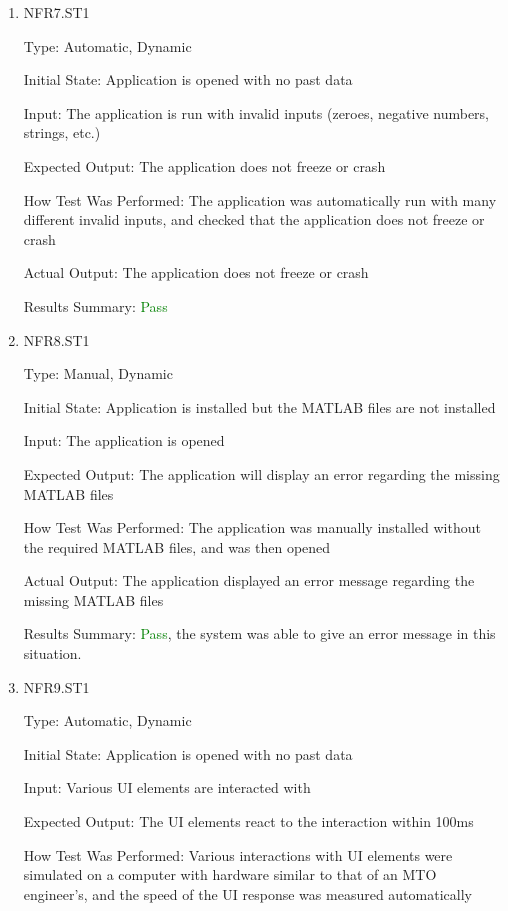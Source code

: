 \documentclass[12pt, titlepage]{article}
\begin{document}
\begin{enumerate}

\item{NFR7.ST1\\}

Type: Automatic, Dynamic

Initial State: Application is opened with no past data

Input: The application is run with invalid inputs (zeroes, negative numbers, strings, etc.)

Expected Output: The application does not freeze or crash

How Test Was Performed: The application was automatically run with many different invalid inputs, and checked that the application does not freeze or crash

Actual Output: The application does not freeze or crash

Results Summary: \textcolor{green} {Pass}

\item{NFR8.ST1\\}

Type: Manual, Dynamic

Initial State: Application is installed but the MATLAB files are not installed

Input: The application is opened

Expected Output: The application will display an error regarding the missing MATLAB files

How Test Was Performed: The application was manually installed without the required MATLAB files, and was then opened

Actual Output: The application displayed an error message regarding the missing MATLAB files

Results Summary: \textcolor{green} {Pass}, the system was able to give an error message in this situation.

\item{NFR9.ST1\\}

Type: Automatic, Dynamic

Initial State: Application is opened with no past data

Input: Various UI elements are interacted with

Expected Output: The UI elements react to the interaction within 100ms

How Test Was Performed: Various interactions with UI elements were simulated on a computer with hardware similar to that of an MTO engineer's, and the speed of the UI response was measured automatically


\end{enumerate}
\end{document}
